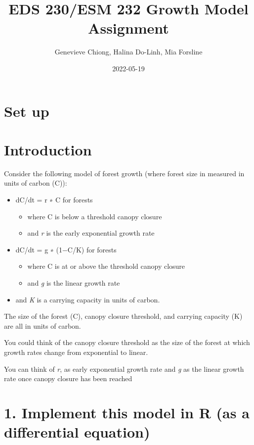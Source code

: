 \documentclass[
]{article}
\title{EDS 230/ESM 232 Growth Model Assignment}
\author{Genevieve Chiong, Halina Do-Linh, Mia Forsline}
\date{2022-05-19}
\begin{document}
\maketitle

\hypertarget{set-up}{%
\section{Set up}\label{set-up}}

\hypertarget{introduction}{%
\section{Introduction}\label{introduction}}

Consider the following model of forest growth (where forest size in
measured in units of carbon (C)):

\begin{itemize}
\item
  dC/dt = r ∗ C for forests

  \begin{itemize}
  \item
    where C is below a threshold canopy closure
  \item
    and \emph{r} is the early exponential growth rate
  \end{itemize}
\item
  dC/dt = g ∗ (1−C/K) for forests

  \begin{itemize}
  \item
    where C is at or above the threshold canopy closure
  \item
    and \emph{g} is the linear growth rate
  \end{itemize}
\item
  and \emph{K} is a carrying capacity in units of carbon.
\end{itemize}

The size of the forest (C), canopy closure threshold, and carrying
capacity (K) are all in units of carbon.

You could think of the canopy closure threshold as the size of the
forest at which growth rates change from exponential to linear.

You can think of \emph{r}, as early exponential growth rate and \emph{g}
as the linear growth rate once canopy closure has been reached

\hypertarget{implement-this-model-in-r-as-a-differential-equation}{%
\section{1. Implement this model in R (as a differential
equation)}\label{implement-this-model-in-r-as-a-differential-equation}}
\end{document}
